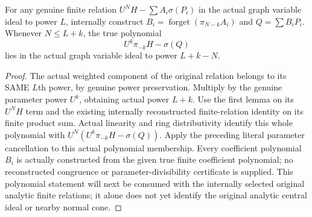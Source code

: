 \begin{theorem}
\label{hir:relative-normal-graph-weight-reconstructed-finite-congruence}
\leanok
For any genuine finite relation $U^NH-\sum A_i\sigma(P_i)$ in the actual graph variable ideal to power $L$, internally construct $B_i=\operatorname{forget}(\pi_{N-k}A_i)$ and $Q=\sum B_iP_i$. Whenever $N\leq L+k$, the true polynomial
\[U^k\pi_{-k}H-\sigma(Q)\]
lies in the actual graph variable ideal to power $L+k-N$.
\end{theorem}
\begin{proof}
The actual weighted component of the original relation belongs to its SAME $L$th power, by genuine power preservation. Multiply by the genuine parameter power $U^k$, obtaining actual power $L+k$. Use the first lemma on its $U^NH$ term and the existing internally reconstructed finite-relation identity on its finite product sum. Actual linearity and ring distributivity identify this whole polynomial with $U^N(U^k\pi_{-k}H-\sigma(Q))$. Apply the preceding literal parameter cancellation to this actual polynomial membership. Every coefficient polynomial $B_i$ is actually constructed from the given true finite coefficient polynomial; no reconstructed congruence or parameter-divisibility certificate is supplied. This polynomial statement will next be consumed with the internally selected original analytic finite relations; it alone does not yet identify the original analytic central ideal or nearby normal cone.
\end{proof}
